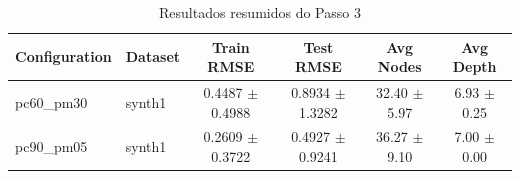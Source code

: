 \begin{table}[htbp]
  \centering
  \caption{Resultados resumidos do Passo 3}
  \label{tab:step3}
  \begin{tabular}{llcccc}
    \toprule
    Configuration & Dataset & Train RMSE & Test RMSE & Avg Nodes & Avg Depth \\
    \midrule
    pc60\_pm30 & synth1 & 0.4487 $\pm$ 0.4988 & 0.8934 $\pm$ 1.3282 & 32.40 $\pm$ 5.97 & 6.93 $\pm$ 0.25 \\
    pc90\_pm05 & synth1 & 0.2609 $\pm$ 0.3722 & 0.4927 $\pm$ 0.9241 & 36.27 $\pm$ 9.10 & 7.00 $\pm$ 0.00 \\
    \bottomrule
  \end{tabular}
\end{table}
